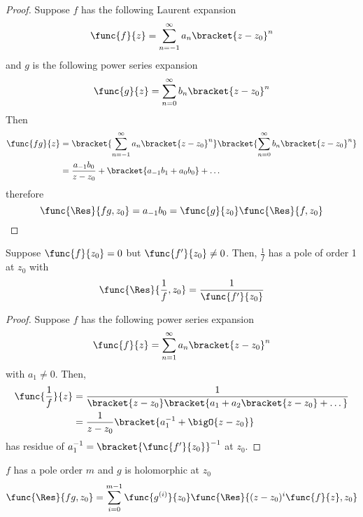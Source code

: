 \begin{proof}
    Suppose \(f\) has the following Laurent expansion 
    \begin{equation*}
        \func{f}{z} = \sum_{n = -1}^{\infty} a_n \bracket{z - z_0}^n
    \end{equation*}
    and \(g\) is the following power series expansion 
    \begin{equation*}
        \func{g}{z} = \sum_{n = 0}^{\infty} b_n \bracket{z - z_0}^n
    \end{equation*}
    Then 
    \begin{align*}
        \func{fg}{z} &= \bracket{\sum_{n = -1}^{\infty} a_n \bracket{z - z_0}^n} \bracket{\sum_{n = 0}^{\infty} b_n \bracket{z - z_0}^n}\\
        &= \dfrac{a_{-1}b_0}{z - z_0} + \bracket{a_{-1}b_1 + a_{0}b_0} + \dots 
    \end{align*}
    therefore 
    \begin{equation*}
        \func{\Res}{fg,z_0} = a_{-1}b_0 = \func{g}{z_0} \func{\Res}{f,z_0}
    \end{equation*}
\end{proof}

\begin{lemma}
    Suppose \(\func{f}{z_0} = 0\) but \(\func{f'}{z_0} \neq 0\). Then, \(\frac{1}{f}\) has a pole of order 1 at \(z_0\) with 
    \begin{equation*}
        \func{\Res}{\dfrac{1}{f}, z_0} = \dfrac{1}{\func{f'}{z_0}}
    \end{equation*}
\end{lemma}

\begin{proof}
    Suppose \(f\) has the following power series expansion 
    \begin{equation*}
        \func{f}{z} = \sum_{n = 1}^{\infty} a_n \bracket{z - z_0}^n
    \end{equation*}
    with \(a_1 \neq 0\). Then, 
    \begin{align*}
        \func{\dfrac{1}{f}}{z} &= \dfrac{1}{\bracket{z - z_0} \bracket{a_1 + a_2 \bracket{z - z_0} + \dots }}\\
        &=\dfrac{1}{z - z_0} \bracket{a_1^{-1} + \bigO{z - z_0}}
    \end{align*}
    has residue of \(a_1^{-1} =\bracket{\func{f'}{z_0}}^{-1} \) at \(z_0\).
\end{proof}

\begin{lemma}
    \(f\) has a pole order \(m\) and \(g\) is holomorphic at \(z_0\)
    \begin{equation*}
        \func{\Res}{fg,z_0} = \sum_{i = 0}^{m - 1} \func{g^{(i)}}{z_0} \func{\Res}{(z - z_0)^i \func{f}{z}, z_0}
    \end{equation*}
\end{lemma}

